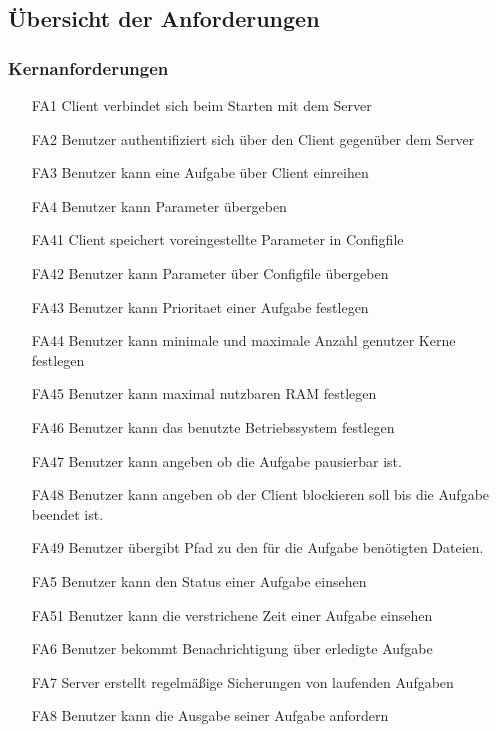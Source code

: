 \documentclass[a4paper,12pt]{article}
\begin{document}
\subsection{Übersicht der Anforderungen}

\subsubsection{Kernanforderungen} %

\begin{itemize}[nosep]
\leftskip=0.5cm

\item[FA1]	\gls{Client} verbindet sich beim Starten mit dem Server
\item[FA2] Benutzer authentifiziert sich über den \gls{Client} gegenüber dem Server
\item[FA3] Benutzer kann eine Aufgabe über \gls{Client} einreihen
\item[FA4] Benutzer kann Parameter übergeben %
\item[FA41]	\gls{Client} speichert voreingestellte Parameter in \gls{Configfile}
\item[FA42]	Benutzer kann Parameter über \gls{Configfile} übergeben
\item[FA43] Benutzer kann \gls{Prioritaet} einer Aufgabe festlegen %
\item[FA44] Benutzer kann minimale und maximale Anzahl genutzer Kerne festlegen %
 \item[FA45] Benutzer kann maximal nutzbaren RAM festlegen %
\item[FA46] Benutzer kann das benutzte Betriebssystem festlegen
\item[FA47] Benutzer kann angeben ob die Aufgabe pausierbar ist. %
\item[FA48] Benutzer kann angeben ob der \gls{Client} blockieren soll bis die Aufgabe beendet ist. %
\item[FA49] Benutzer übergibt Pfad zu den für die Aufgabe benötigten Dateien. %
\item[FA5] Benutzer kann den Status einer Aufgabe einsehen
\item[FA51] Benutzer kann die verstrichene Zeit einer Aufgabe einsehen %
\item[FA6] Benutzer bekommt Benachrichtigung über erledigte Aufgabe
\item[FA7] Server erstellt regelmäßige Sicherungen von laufenden Aufgaben
\item[FA8] Benutzer kann die Ausgabe seiner Aufgabe anfordern
\end{itemize}
\end{document}
